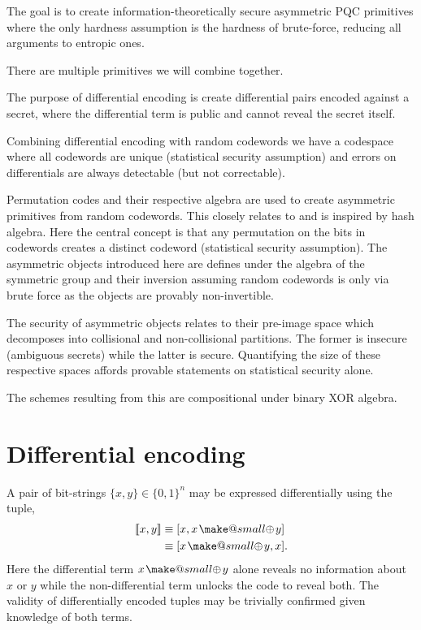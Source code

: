 \documentclass[twocolumn, aps, amsmath, amssymb, nofootinbib, superscriptaddress, longbibliography, doublefloatfix, table-of-contents, eqsecnum, rmp]{revtex4-2}
\makeatletter
\def\diff#1#2{\llbracket #1,#2\rrbracket}
\newcommand{\soplus}{{{\hspace{1pt}}{\mathbin{\mathpalette\make@small{\mathbin\oplus}}}}{\hspace{1pt}}}
\newcommand{\make@small}[2]{%
  \vcenter{\hbox{%
    \scalebox{0.6}{$\m@th#1#2$}%
  }}%
}
\makeatother
\begin{document}
The goal is to create information-theoretically secure asymmetric PQC primitives where the only hardness assumption is the hardness of brute-force, reducing all arguments to entropic ones.

There are multiple primitives we will combine together.

The purpose of differential encoding is create differential pairs encoded against a secret, where the differential term is public and cannot reveal the secret itself.

Combining differential encoding with random codewords we have a codespace where all codewords are unique (statistical security assumption) and errors on differentials are always detectable (but not correctable).

Permutation codes and their respective algebra are used to create asymmetric primitives from random codewords. This closely relates to and is inspired by hash algebra. Here the central concept is that any permutation on the bits in codewords creates a distinct codeword (statistical security assumption). The asymmetric objects introduced here are defines under the algebra of the symmetric group and their inversion assuming random codewords is only via brute force as the objects are provably non-invertible.

The security of asymmetric objects relates to their pre-image space which decomposes into collisional and non-collisional partitions. The former is insecure (ambiguous secrets) while the latter is secure. Quantifying the size of these respective spaces affords provable statements on statistical security alone.

The schemes resulting from this are compositional under binary XOR algebra.

\section{Differential encoding}

A pair of bit-strings $\{x,y\}\in\{0,1\}^n$ may be expressed differentially using the tuple,
\begin{align}
	\diff{x}{y} &\equiv [x,x\soplus y] \nonumber\\
	&\equiv [x\soplus y,x].
\end{align}
Here the differential term $x\soplus y$ alone reveals no information about $x$ or $y$ while the non-differential term unlocks the code to reveal both. The validity of differentially encoded tuples may be trivially confirmed given knowledge of both terms.
\end{document}
